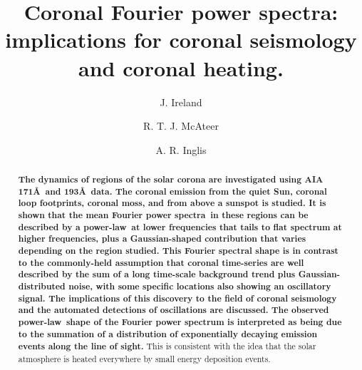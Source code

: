 \documentclass[onecolumn]{emulateapj}
\newcommand{\PA}{power spectra}
\newcommand{\PL}{power-law}
\newcommand{\mFpa}{mean Fourier \PA}
\begin{document}

\title{Coronal Fourier power spectra: implications for coronal
  seismology and coronal heating.}


\author{J. Ireland}

\author{R. T. J. McAteer}

\author{A. R. Inglis}


\begin{abstract}

  {\bf The dynamics of regions of the solar corona are investigated
    using AIA 171\AA\ and 193\AA\ data.  The coronal emission from the
    quiet Sun, coronal loop footprints, coronal moss, and from above a
    sunspot is studied.  It is shown that the \mFpa\ in these regions
    can be described by a \PL\ at lower frequencies that tails to
    flat spectrum at higher frequencies, plus a Gaussian-shaped
    contribution that varies depending on the region studied. This
    Fourier spectral shape is in contrast to the commonly-held
    assumption that coronal time-series are well described by the sum
    of a long time-scale background trend plus Gaussian-distributed
    noise, with some specific locations also showing an oscillatory
    signal.  The implications of this discovery to the field of
    coronal seismology and the automated detections of oscillations
    are discussed.  The observed \PL\ shape of the Fourier power
    spectrum is interpreted as being due to the summation of a
    distribution of exponentially decaying emission events along the
    line of sight.}  This is consistent with the idea that the solar
  atmosphere is heated everywhere by small energy deposition events.
\end{abstract}
\end{document}
